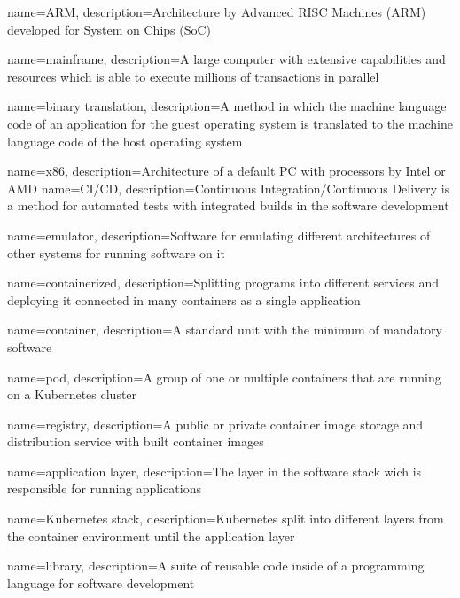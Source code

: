 {
    name={ARM},
    description={Architecture by Advanced RISC Machines (ARM) developed for System on Chips (SoC)}
}

{
    name={mainframe},
    description={A large computer with extensive capabilities and resources which is able to execute millions of transactions in parallel}
}

{
    name={binary translation},
    description={A method in which the machine language code of an application for the guest operating system is translated to the machine language code of the host operating system}
}

{
    name={x86},
    description={Architecture of a default PC with processors by Intel or AMD}
}
{
    name={CI/CD},
    description={Continuous Integration/Continuous Delivery is a method for automated tests with integrated builds in the software development}
}

{
    name={emulator},
    description={Software for emulating different architectures of other systems for running software on it}
}

{
    name={containerized},
    description={Splitting programs into different services and deploying it connected in many containers as a single application}
}

{
    name={container},
    description={A standard unit with the minimum of mandatory software}
}

{
    name={pod},
    description={A group of one or multiple containers that are running on a Kubernetes cluster}
}

{
    name={registry},
    description={A public or private container image storage and distribution service with built container images}
}

{
    name={application layer},
    description={The layer in the software stack wich is responsible for running applications}
}

{
    name={Kubernetes stack},
    description={Kubernetes split into different layers from the container environment until the application layer}
}

{
    name={library},
    description={A suite of reusable code inside of a programming language for software development}
}

